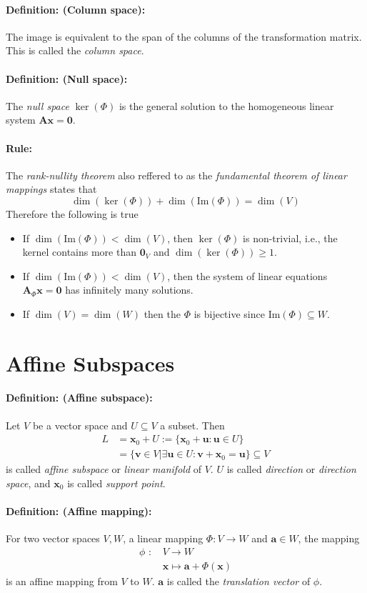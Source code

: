 \documentclass[12pt]{article}
\newcommand{\A}{{\bm{A}}}
\newcommand{\xdefinition}[2]{\paragraph{\colorbox{#1!30}{\textbf{Definition:}} (#2):}}
\newcommand{\xrule}[1]{\paragraph{\colorbox{#1!30}{\textbf{Rule:}}}}
\begin{document}
\xdefinition{blue}{Column space} The image is equivalent to the span of the columns of the transformation matrix. This is called the \textit{column space}.

\xdefinition{blue}{Null space} The \textit{null space} $\ker(\Phi)$ is the general solution to the homogeneous linear system $\A \bm{x} = \bm{0}$.

\xrule{red} The \textit{rank-nullity theorem} also reffered to as the \textit{fundamental theorem of linear mappings} states that
%
\begin{equation}
	\dim(\ker(\Phi)) + \dim(\text{Im}(\Phi)) = \dim(V)
\end{equation}
%
Therefore the following is true
%
\begin{itemize}
	\item If $\dim(\text{Im}(\Phi)) < \dim(V)$, then $\ker(\Phi)$ is non-trivial, i.e., the kernel contains more than $\bm{0}_V$ and $\dim(\ker(\Phi)) \geqslant 1$.
	\item If $\dim(\text{Im}(\Phi)) < \dim(V)$, then the system of linear equations $\A_\Phi \bm{x} = \bm{0}$ has infinitely many solutions.
	\item If $\dim(V) = \dim(W)$ then the $\Phi$ is bijective since $\text{Im}(\Phi) \subseteq W$.
\end{itemize}

\section{Affine Subspaces}

\xdefinition{red}{Affine subspace} Let $V$ be a vector space and $U \subseteq V$ a subset. Then
%
\begin{equation}
\begin{aligned}
	L &= \bm{x}_0 + U := \{ \bm{x}_0 + \bm{u} : \bm{u} \in U\} \\
	  &= \{ \bm{v} \in V| \exists \bm{u} \in U : \bm{v} + \bm{x}_0 = \bm{u} \} \subseteq V
\end{aligned}
\end{equation}
%
is called \textit{affine subspace} or \textit{linear manifold} of $V$. $U$ is called \textit{direction} or \textit{direction space}, and $\bm{x}_0$ is called \textit{support point}.

\xdefinition{red}{Affine mapping} For two vector spaces $V, W$, a linear mapping $\Phi : V \rightarrow W$ and $\bm{a} \in W$, the mapping
%
\begin{equation}
\begin{aligned}
	\phi \text{ : }& V \rightarrow W \\
	              & \bm{x} \mapsto \bm{a} + \Phi(\bm{x})
\end{aligned}
\end{equation}
%
is an affine mapping from $V$ to $W$. $\bm{a}$ is called the \textit{translation vector} of $\phi$.
\end{document}
